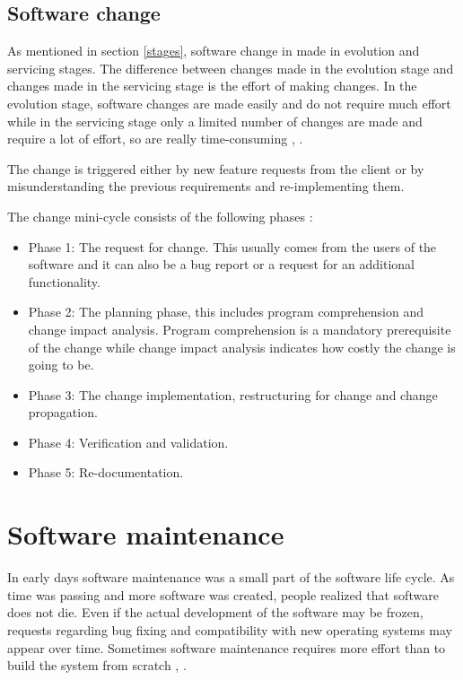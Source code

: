 \documentclass[12pt]{mitthesis}
\begin{document}
\subsection{Software change}
\label{change}
As mentioned in section \ref{stages}, software change in made in evolution and servicing stages. The difference between changes made in the evolution stage and changes made in the servicing stage is the effort of making changes. In the evolution stage, software changes are made easily and do not require much effort while in the servicing stage only a limited number of changes are made and require a lot of effort, so are really time-consuming \cite{Bennett}, \cite{Rajlich}.

The change is triggered either by new feature requests from the client or by misunderstanding the previous requirements and re-implementing them. 

The change mini-cycle consists of the following phases \cite{810308}:
\begin{itemize}
\item Phase 1: The request for change. This usually comes from the users of the software and it can also be a bug report or a request for an additional functionality. 
\item Phase 2: The planning phase, this includes program comprehension and change impact analysis. Program comprehension is a mandatory prerequisite of the change while change
impact analysis indicates how costly the change is going to be. \cite{Bohner}
\item Phase 3: The change implementation, restructuring for change and change propagation.
\item Phase 4: Verification and validation.
\item Phase 5: Re-documentation.
\end{itemize}

\section{Software maintenance}
In early days software maintenance was a small part of the software life cycle. As time was passing and more software was created, people realized that software does not die. Even if the actual development of the software may be frozen, requests regarding bug fixing and compatibility with new operating systems may appear over time. Sometimes software maintenance requires more effort than to build the system from scratch \cite{Yang:2003:SES:599790}, \cite{nsbreloaded}.
\end{document}
